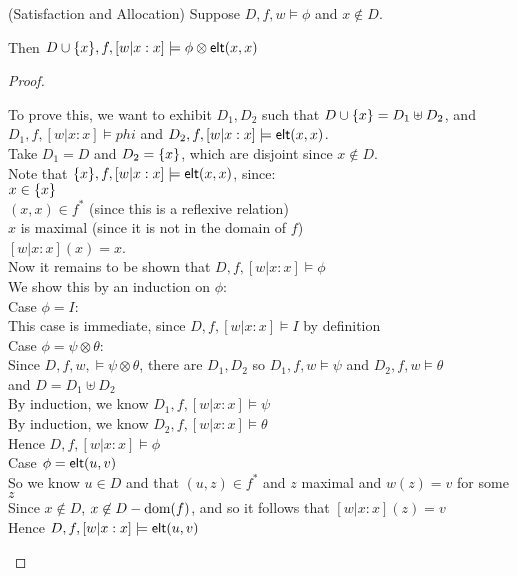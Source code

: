 \begin{lemma}{(Satisfaction and Allocation)}
Suppose $D, f, w \models \phi$ and $x \not \in D$. 

Then $D \cup \{{x}\}, f, [w|x:x] \models \phi \otimes \mathsf{elt}({x}, {x})$
\end{lemma}

\begin{proof}
\begin{tabbedproof}
\oo To prove this, we want to exhibit $D_1, D_2$ such that $D \cup \{{x}\} = D_1 \uplus D_2$, 
   and $D_1, f, [w|x:x] \models phi$ and $D_2, f, [w|x:x] \models \mathsf{elt}({x}, {x})$. \\ 
\oo Take $D_1 = D$ and $D_2 = \{{x}\}$, which are disjoint since $x \not\in D$. \\ 
\oo Note that $\{{x}\}, f, [w|x:x] \models \mathsf{elt}({x}, {x})$, since:  \\
\oox $x \in \{{x}\}$  \\
\oox $(x, x) \in f^*$ (since this is a reflexive relation) \\
\oox $x$ is maximal (since it is not in the domain of $f$) \\
\oox $[w|x:x](x) = x$. \\
\oo Now it remains to be shown that $D, f, [w|x:x] \models \phi$ \\
\oo We show this by an induction on $\phi$:  \\
\ooo Case $\phi = I$:\\ 
\oooo This case is immediate, since $D, f, [w|x:x] \models I$ by definition \\ 
\ooo Case $\phi = \psi \otimes \theta$: \\    
\oooo Since $D, f, w, \models \psi \otimes \theta$, there are $D_1, D_2$ so $D_1, f, w \models \psi$ and $D_2, f, w \models \theta$ \\
\ooox and $D = D_1 \uplus D_2$ \\
\oooo By induction, we know $D_1, f, [w|x:x] \models \psi$ \\ 
\oooo By induction, we know $D_2, f, [w|x:x] \models \theta$ \\
\oooo Hence $D, f, [w|x:x] \models \phi$ \\
\ooo Case $\phi = \mathsf{elt}({u}, {v})$ \\
\oooo So we know $u \in D$ and that $(u,z) \in f^{*}$ and $z$ maximal and $w(z) = v$ for some $z$ \\
\oooo Since $x \not \in D$, $x \not\in D - \mbox{dom}({f})$, and so it follows that $[w|x:x](z) = v$ \\
\oooo Hence $D, f, [w|x:x] \models \mathsf{elt}({u}, {v})$ 
\end{tabbedproof}
\end{proof}

